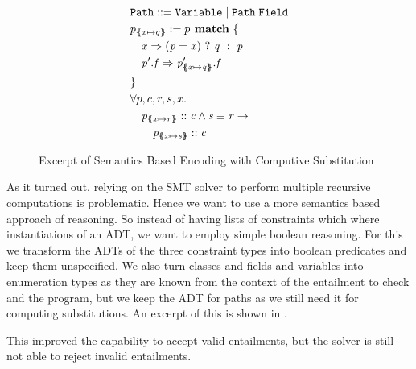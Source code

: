 \documentclass[a4paper]{article}
\begin{document}
\begin{figure}[ht]
  \begin{align*}
    &\Path ::= \Variable \mid \Path.\Field\\
    &\subst{p}{x}{q} := p \match~\{\\
    &\quad \case{x}{\ite{(p=x)}{q}{p}}\\
    &\quad \case{p'.f}{\subst{p'}{x}{q}.f}\\
    &\}\\
    &\forall p,c,r,s,x.\\
    &\quad \instOf{p_{\sub{x}{r}}}{c} \land \pathEq{s}{r} \rightarrow\\
    &\qquad \instOf{p_{\sub{x}{s}}}{c}
  \end{align*}
  \caption{Excerpt of Semantics Based Encoding with Computive Substitution}
  \label{fig:semantic-entailment-excerpt}
\end{figure}

As it turned out, relying on the SMT solver to perform multiple recursive computations is problematic.
Hence we want to use a more semantics based approach of reasoning.
So instead of having lists of constraints which where instantiations of an ADT,
we want to employ simple boolean reasoning.
For this we transform the ADTs of the three constraint types into boolean predicates
and keep them unspecified. We also turn classes and fields and variables into enumeration types
as they are known from the context of the entailment to check and the program,
but we keep the ADT for paths as we still need it for computing substitutions.
An excerpt of this is shown in .

This improved the capability to accept valid entailments,
but the solver is still not able to reject invalid entailments.

\end{document}
